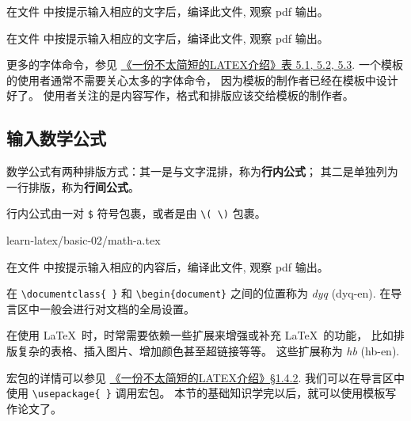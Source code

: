 \documentclass[
    11pt,
    base=hide,
    cite=authoryear,
    device=phone,
    lang=cn,
    mode=simple,
    result=answer,
    toc=onecol,
]{elegantbook_sierxue}
\begin{document}
\begin{exercise}\label{ex:basic-01-text-a}
    在文件 
    中按提示输入相应的文字后，编译此文件, 观察 pdf 输出。
\end{exercise}

\begin{exercise}\label{ex:basic-01-text-b}
    在文件 
    中按提示输入相应的文字后，编译此文件, 观察 pdf 输出。
\end{exercise}
\begin{share}\label{share:user-designer}
    更多的字体命令，参见
    \hyperlink{books/lshort-zh-cn.pdf.74}%
    {《一份不太简短的LATEX介绍》表 5.1, 5.2, 5.3}.
    一个模板的使用者通常不需要关心太多的字体命令，
    因为模板的制作者已经在模板中设计好了。
    使用者关注的是内容写作，格式和排版应该交给模板的制作者。
\end{share}

\subsection{输入数学公式}%
\label{sub:latex-math}

\begin{latex}\label{tex:math}
    数学公式有两种排版方式：其一是与文字混排，称为\textbf{行内公式}；
    其二是单独列为一行排版，称为\textbf{行间公式}。
\end{latex}

\begin{latex}\label{tex:math-inline}
    行内公式由一对 \texttt\$ 符号包裹，或者是由 \lstinline|\( \)| 包裹。
\end{latex}
%
{learn-latex/basic-02/math-a.tex}
\begin{exercise}\label{ex:basic-02-math-a}
    在文件 
    中按提示输入相应的内容后，编译此文件, 观察 pdf 输出。
\end{exercise}

\begin{latex}\label{tex:preamble}
    在 \lstinline|\documentclass{ }| 和
    \lstinline|\begin{document}| 之间的位置称为
    \emph{\gls{dyq}} (\gls{dyq-en}).
    在导言区中一般会进行对文档的全局设置。
\end{latex}
\begin{latex}\label{tex:package}
    在使用 \LaTeX\ 时，时常需要依赖一些扩展来增强或补充 \LaTeX\ 的功能，
    比如排版复杂的表格、插入图片、增加颜色甚至超链接等等。
    这些扩展称为
    \emph{\gls{hb}} (\gls{hb-en}).
\end{latex}
宏包的详情可以参见 \hyperlink{books/lshort-zh-cn.pdf.18}%
{《一份不太简短的LATEX介绍》\S1.4.2}.
我们可以在导言区中使用 \lstinline|\usepackage{ }| 调用宏包。
本节的基础知识学完以后，就可以使用模板写作论文了。
\end{document}
